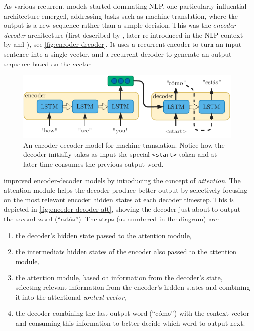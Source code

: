 \documentclass[bsc,frontabs,singlespacing,parskip,deptreport]{infthesis}
\begin{document}
{{    %
    As various recurrent models started dominating NLP, one particularly influential architecture emerged, addressing tasks such as machine translation, where the output is a new sequence rather than a simple decision. This was the \textit{encoder-decoder} architecture (first described by \citet{Hinton_1994}, later re-introduced in the NLP context by \citet{Kalchbrenner_2013} and \citet{Sutskever_2014}), see \autoref{fig:encoder-decoder}. It uses a recurrent encoder to turn an input sentence into a single vector, and a recurrent decoder to generate an output sequence based on the vector.
    \begin{figure}[h!t]
      \centering
      \includegraphics[width=11.5cm]{graphics/encoder-decoder}
      \cprotect\caption{An encoder-decoder model for machine translation. Notice how the decoder initially takes as input the special \verb|<start>| token and at later time consumes the previous output word.}
      \label{fig:encoder-decoder}
    \end{figure}

    \citet{Bahdanau_2014} improved encoder-decoder models by introducing the concept of \textit{attention}. The attention module helps the decoder produce better output by selectively focusing on the most relevant encoder hidden states at each decoder timestep. This is depicted in \autoref{fig:encoder-decoder-att}, showing the decoder just about to output the second word (``est\'as''). The steps (as numbered in the diagram) are:
    \begin{enumerate}
      \item the decoder's hidden state passed to the attention module,
      \item the intermediate hidden states of the encoder also passed to the attention module,
      \item the attention module, based on information from the decoder's state, selecting relevant information from the encoder's hidden states and combining it into the attentional \textit{context vector},
      \item the decoder combining the last output word (``c\'omo'') with the context vector and consuming this information to better decide which word to output next. 
    \end{enumerate}

}}
\end{document}
